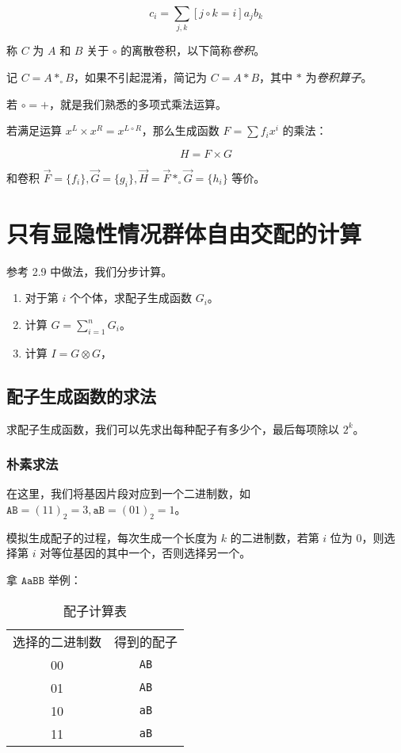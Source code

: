 \documentclass[12pt]{article} %
\begin{document}
\begin{equation*}
    c_i=\sum_{j,k} [j \circ k=i] a_jb_k
\end{equation*}

称 $C$ 为 $A$ 和 $B$ 关于 $\circ$ 的离散卷积，以下简称\textsl{卷积}。

记 $C=A*_{\circ}B$，如果不引起混淆，简记为 $C=A*B$，其中 $*$ 为\textsl{卷积算子}。

若 $\circ = +$，就是我们熟悉的多项式乘法运算。



若满足运算 $x^L \times x^R = x^{L \circ R}$，那么生成函数 $F=\sum f_i x^i$ 的乘法：

$$H=F \times G$$

和卷积 $\vec F=\{f_i\},\vec G=\{g_i\},\vec H=\vec F *_{\circ} \vec G=\{h_i\}$ 等价。

\newpage

\section{只有显隐性情况群体自由交配的计算}

参考 2.9 中做法，我们分步计算。

\begin{enumerate}
    \item 对于第 $i$ 个个体，求配子生成函数 $G_i$。
    \item 计算 $G=\sum_{i=1}^n G_i$。 
    \item 计算 $I=G \otimes G$，
\end{enumerate}

\subsection{配子生成函数的求法}

求配子生成函数，我们可以先求出每种配子有多少个，最后每项除以 $2^k$。 

\subsubsection*{朴素求法}

在这里，我们将基因片段对应到一个二进制数，如 $\texttt{AB}=(11)_2=3,\texttt{aB}=(01)_2=1$。

模拟生成配子的过程，每次生成一个长度为 $k$ 的二进制数，若第 $i$ 位为 $0$，则选择第 $i$ 对等位基因的其中一个，否则选择另一个。

拿 $\texttt{AaBB}$ 举例：

\begin{table}[htbp]
    \centering
    \caption{配子计算表}
    \begin{tabular}{|c|c|}
        选择的二进制数 & 得到的配子 \\
        00 & \texttt{AB} \\
        01 & \texttt{AB} \\
        10 & \texttt{aB} \\
        11 & \texttt{aB} \\
    \end{tabular}
\end{table}
\end{document}
